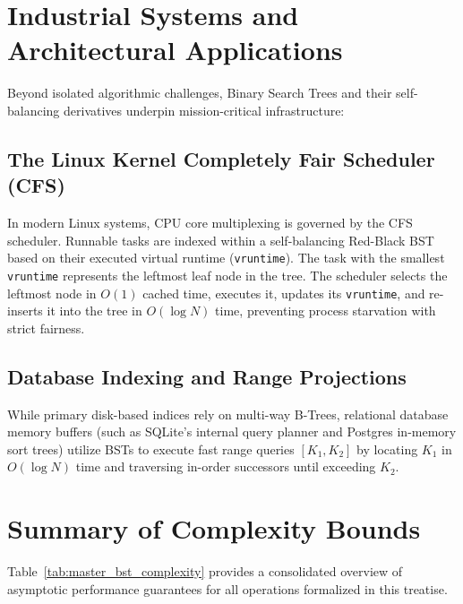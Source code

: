\documentclass[10pt,journal,compsoc,onecolumn]{IEEEtran}
\begin{document}
\section{Industrial Systems and Architectural Applications}
\label{sec:systems}

Beyond isolated algorithmic challenges, Binary Search Trees and their self-balancing derivatives underpin mission-critical infrastructure:

\subsection{The Linux Kernel Completely Fair Scheduler (CFS)}
In modern Linux systems, CPU core multiplexing is governed by the CFS scheduler. Runnable tasks are indexed within a self-balancing Red-Black BST based on their executed virtual runtime (\texttt{vruntime}). The task with the smallest \texttt{vruntime} represents the leftmost leaf node in the tree. The scheduler selects the leftmost node in $O(1)$ cached time, executes it, updates its \texttt{vruntime}, and re-inserts it into the tree in $O(\log N)$ time, preventing process starvation with strict fairness.

\subsection{Database Indexing and Range Projections}
While primary disk-based indices rely on multi-way B-Trees, relational database memory buffers (such as SQLite's internal query planner and Postgres in-memory sort trees) utilize BSTs to execute fast range queries $[K_1, K_2]$ by locating $K_1$ in $O(\log N)$ time and traversing in-order successors until exceeding $K_2$.

\section{Summary of Complexity Bounds}
\label{sec:summary}

Table~\ref{tab:master_bst_complexity} provides a consolidated overview of asymptotic performance guarantees for all operations formalized in this treatise.
\end{document}
